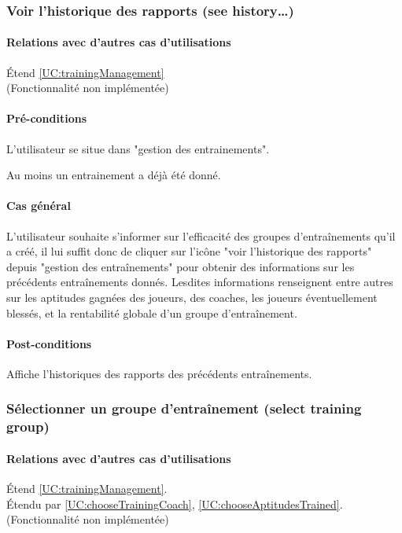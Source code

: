 \subsubsection{Voir l'historique des rapports (see history…)}
\label{UC:TrainingHistory}
\paragraph{Relations avec d'autres cas d'utilisations}
Étend \ref{UC:trainingManagement}
\\(Fonctionnalité non implémentée)
\paragraph{Pré-conditions}
\begin{list}{}{\leftmargin=1.5em}
\item{L'utilisateur se situe dans "gestion des entrainements".}
\item{Au moins un entrainement a déjà été donné.}
\end{list}
\paragraph{Cas général}
L'utilisateur souhaite s'informer sur l'efficacité des groupes d'entraînements qu'il a créé, il lui suffit donc de cliquer sur l'icône "voir l'historique des rapports" depuis "gestion des entraînements" pour obtenir des informations sur les précédents entraînements donnés. Lesdites informations renseignent entre autres sur les aptitudes gagnées des joueurs, des coaches, les joueurs éventuellement blessés, et la rentabilité globale d'un groupe d'entraînement. 
\paragraph{Post-conditions}
\begin{list}{}{\leftmargin=1.5em}
\item{Affiche l'historiques des rapports des précédents entraînements.}
\end{list}

\subsubsection{Sélectionner un groupe d'entraînement (select training group)}
\label{UC:selectTrainingGroup}
\paragraph{Relations avec d'autres cas d'utilisations}
Étend \ref{UC:trainingManagement}.\\
Étendu par \ref{UC:chooseTrainingCoach}, \ref{UC:chooseAptitudesTrained}.
\\(Fonctionnalité non implémentée)
